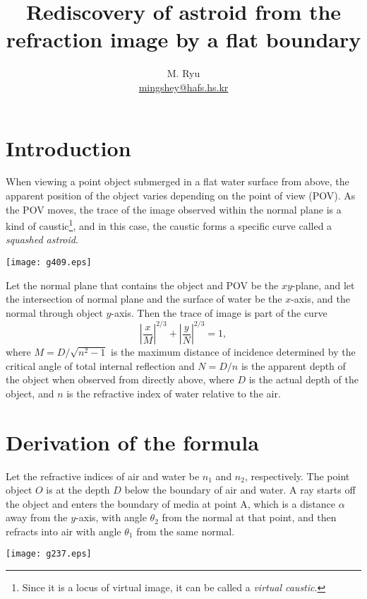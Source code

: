 \documentclass[twocolumn]{article}
\title{Rediscovery of astroid from the refraction image by a flat boundary}
\author{M. Ryu \\ {\href{mailto:mingshey@hafs.hs.kr}{mingshey@hafs.hs.kr}}}
\begin{document}
\maketitle
\section{Introduction}
When viewing a point object submerged in a flat water surface from above, 
the apparent position of the object varies depending on the point of 
view (POV). As the POV moves, the trace of the image observed within the 
normal plane is a kind of caustic\footnote{Since it is a locus of virtual 
image, it can be called a \emph{virtual caustic}.}, and in this case, 
the caustic forms a specific curve called a  \emph{squashed astroid}.

\texttt{[image: g409.eps]}

Let the normal plane that contains the object and  POV be the $xy$-plane,
and let the intersection of  normal plane and the surface of water be the 
$x$-axis, and the normal through  object $y$-axis. Then the trace of image 
is part of the curve 
$$ \left| \dfrac{x}{M} \right| ^ {2/3} + \left| \dfrac{y}{N} \right| ^ {2/3} = 1,$$
where $M = D/\sqrt{n^2 - 1}$ is the maximum distance of incidence
determined by the critical angle of total internal reflection and $N = D/n$ 
is the apparent depth of the object when observed from directly above, where
$D$ is the actual depth of the object, and $n$ is the refractive index of 
water relative to the air.

\section{Derivation of the formula}
Let the refractive indices  of air and water be $n_1$ and $n_2$, respectively. 
The point object $O$ is at the depth $D$ below the boundary of air and water. 
A ray starts off the object and enters the boundary of media at point A, which is a distance $\alpha$ away 
from the $y$-axis, with angle $\theta_2$ from the normal at that point, and then 
refracts into air with angle $\theta_1$ from the same normal.

\texttt{[image: g237.eps]}
\end{document}
